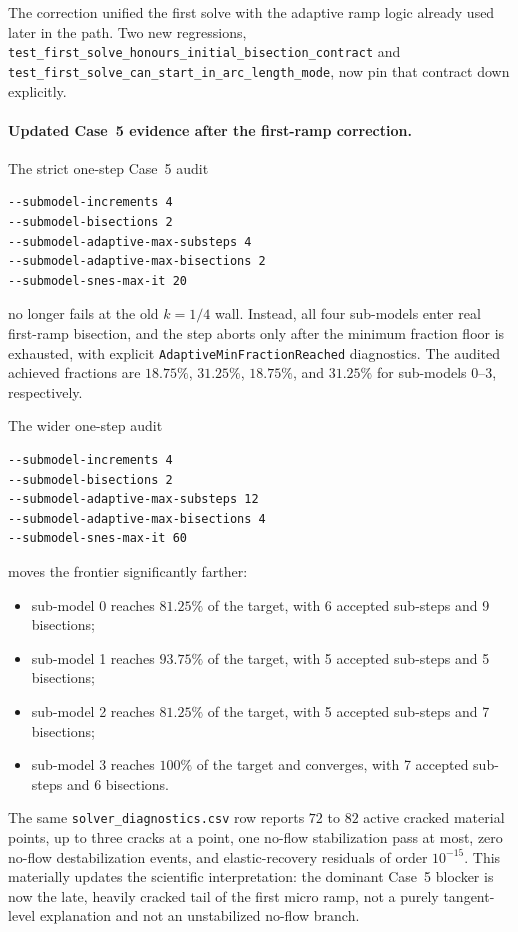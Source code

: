 The correction unified the first solve with the adaptive ramp logic already
used later in the path.  Two new regressions,
\texttt{test\_first\_solve\_honours\_initial\_bisection\_contract} and
\texttt{test\_first\_solve\_can\_start\_in\_arc\_length\_mode}, now pin that
contract down explicitly.

\paragraph{Updated Case~5 evidence after the first-ramp correction.}
The strict one-step Case~5 audit
\begin{verbatim}
--submodel-increments 4
--submodel-bisections 2
--submodel-adaptive-max-substeps 4
--submodel-adaptive-max-bisections 2
--submodel-snes-max-it 20
\end{verbatim}
no longer fails at the old \(k=1/4\) wall.  Instead, all four sub-models enter
real first-ramp bisection, and the step aborts only after the minimum fraction
floor is exhausted, with explicit \texttt{AdaptiveMinFractionReached}
diagnostics.  The audited achieved fractions are \(18.75\%\), \(31.25\%\),
\(18.75\%\), and \(31.25\%\) for sub-models 0--3, respectively.

The wider one-step audit
\begin{verbatim}
--submodel-increments 4
--submodel-bisections 2
--submodel-adaptive-max-substeps 12
--submodel-adaptive-max-bisections 4
--submodel-snes-max-it 60
\end{verbatim}
moves the frontier significantly farther:
\begin{itemize}
  \item sub-model 0 reaches \(81.25\%\) of the target, with 6 accepted
    sub-steps and 9 bisections;
  \item sub-model 1 reaches \(93.75\%\) of the target, with 5 accepted
    sub-steps and 5 bisections;
  \item sub-model 2 reaches \(81.25\%\) of the target, with 5 accepted
    sub-steps and 7 bisections;
  \item sub-model 3 reaches \(100\%\) of the target and converges, with 7
    accepted sub-steps and 6 bisections.
\end{itemize}
The same \texttt{solver\_diagnostics.csv} row reports \(72\) to \(82\) active
cracked material points, up to three cracks at a point, one no-flow
stabilization pass at most, zero no-flow destabilization events, and
elastic-recovery residuals of order \(10^{-15}\).  This materially updates the
scientific interpretation: the dominant Case~5 blocker is now the late,
heavily cracked tail of the first micro ramp, not a purely tangent-level
explanation and not an unstabilized no-flow branch.

